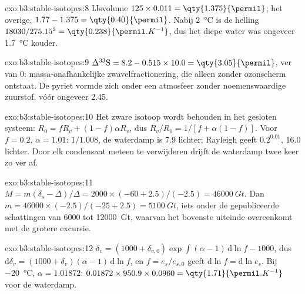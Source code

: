 \begin{solution}{exo:b3:stable-isotopes:8}
IJsvolume $125\times0.011 = \qty{1.375}{\permil}$; het overige, $1.77 - 1.375 =
\qty{0.40}{\permil}$. Nabij \qty{2}{\celsius} is de helling $18030/275.15^2 =
\qty{0.238}{\permil.K^{-1}}$, dus het diepe water was ongeveer \qty{1.7}{\celsius}
kouder.
\end{solution}

\begin{solution}{exo:b3:stable-isotopes:9}
$\Delta^{33}\mathrm S = 8.2 - 0.515\times10.0 = \qty{3.05}{\permil}$, ver van 0:
massa-onafhankelijke zwavelfractionering, die alleen zonder ozonscherm ontstaat. De pyriet
vormde zich onder een atmosfeer zonder noemenswaardige zuurstof, vóór ongeveer
\qty{2.45}{\Ga}.
\end{solution}

\begin{solution}{exo:b3:stable-isotopes:10}
Het zware isotoop wordt behouden in het gesloten systeem: $R_0 = fR_v + (1 -
f)\alpha R_v$, dus $R_v/R_0 = 1/[f + \alpha(1 - f)]$. Voor $f = 0.2$, $\alpha =
1.01$: $1/1.008$, de waterdamp is \qty{7.9}{\permil} lichter; Rayleigh geeft
$0.2^{0.01}$, \qty{16.0}{\permil} lichter. Door elk condensaat meteen te verwijderen
drijft de waterdamp twee keer zo ver af.
\end{solution}

\begin{solution}{exo:b3:stable-isotopes:11}
$M = m(\delta_s - \Delta)/\Delta = 2000\times(-60 + 2.5)/(-2.5) = \qty{46000}{Gt}$.
Dan $m = 46000\times(-2.5)/(-25 + 2.5) = \qty{5100}{Gt}$, iets onder de
gepubliceerde schattingen van 6000 tot \qty{12000}{Gt}, waarvan het bovenste uiteinde overeenkomt met de grotere
excursie.
\end{solution}

\begin{solution}{exo:b3:stable-isotopes:12}
$\delta_v = (1000 + \delta_{v,0})\exp\int(\alpha - 1)\,\mathrm d\ln f - 1000$, dus
$\mathrm d\delta_v = (1000 + \delta_v)(\alpha - 1)\,\mathrm d\ln f$, en $f =
e_s/e_{s,0}$ geeft $\mathrm d\ln f = \mathrm d\ln e_s$. Bij \qty{-20}{\celsius},
$\alpha = 1.01872$: $0.01872\times950.9\times0.0960 =
\qty{1.71}{\permil.K^{-1}}$ voor de waterdamp.
\end{solution}

